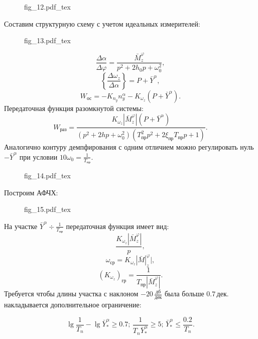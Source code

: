 \documentclass{article}
\begin{document}
\begin{figure}[H]
	\centering
	{fig_12.pdf_tex}
\end{figure}
Составим структурную схему с учетом идеальных измерителей:
\begin{figure}[H]
	\centering
	{fig_13.pdf_tex}
\end{figure}
\[
	\frac{\Delta \alpha}{\Delta \varphi} = \frac{\bar{M}_z^\varphi}{p^2 + 2 h_0
		p + \omega_0^2},
\]
\[
	\left\{ \frac{\Delta \omega_z}{\Delta \alpha}\right\} = P + \bar{Y}^\alpha,
\]
\[
	W_\text{ос} = -K_{n_y} n_y^\alpha - K_{\omega_z} (P + \bar{Y}^\alpha).
\]
Передаточная функция разомкнутой системы:
\[
	W_\text{раз} = \frac{K_{\omega_z} |\bar{M}_z^{\varphi}|(P +
	\bar{Y}^\alpha)}{(p^2 + 2h p + \omega_0^2)(T_\text{пр}^2 p^2 + 2
	\xi_\text{пр} T_\text{пр} p + 1)}.
\]
Аналогично контуру демпфирования с одним отличием можно регулировать нуль
$-\bar{Y}^\alpha$ при условии $10 \omega_0 = \frac{1}{T_\text{пр}}$.
\begin{figure}[H]
	\centering
	{fig_14.pdf_tex}
\end{figure}
Построим АФЧХ:
\begin{figure}[H]
	\centering
	{fig_15.pdf_tex}
\end{figure}
На участке $\bar{Y}^\alpha \div \frac{1}{T_\text{пр}}$ передаточная функция
имеет вид:
\[
	\frac{K_{\omega_z}|\bar{M}_z^\varphi|}{p},
\]
\[
	\omega_\text{ср} = K_{\omega_z} |\bar{M}|_z^\varphi|,
\]
\[
	(K_{\omega_z})_\text{гр} = \frac{1}{T_\text{пр} |\bar{M}_z^\varphi|}.
\]
Требуется чтобы длины участка с наклоном $-20 \, \frac{\text{дб}}{\text{дек}}$
была больше $0.7 \, \text{дек}.$ накладывается дополнительное ограничение:

\[
	\lg \frac{1}{T_n} - \lg \bar{Y}^{\alpha}_* \geq 0.7;\, \frac{1}{T_n
		\bar{Y}^{\alpha}_*} \geq 5; \, \bar{Y}^{\alpha}_* \leq \frac{0.2}{T_n}.
\]
\end{document}
